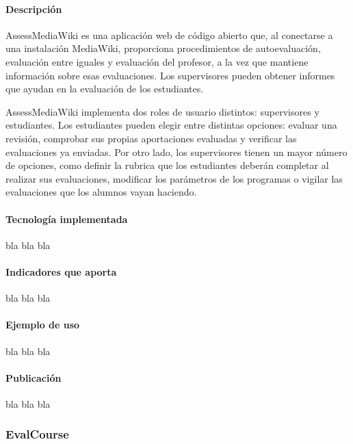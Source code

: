 \paragraph*{Descripción}

AssessMediaWiki es una aplicación web de código abierto que, al conectarse a una instalación MediaWiki, proporciona procedimientos de autoevaluación, evaluación entre iguales y evaluación del profesor, a la vez que mantiene información sobre esas evaluaciones. Los supervisores pueden obtener informes que ayudan en la evaluación de los estudiantes.

AssessMediaWiki implementa dos roles de usuario distintos: supervisores y estudiantes. Los estudiantes pueden elegir entre distintas opciones: evaluar una revisión, comprobar sus propias aportaciones evaluadas y verificar las evaluaciones ya enviadas. Por otro lado, los supervisores tienen un mayor número de opciones, como definir la rubrica que los estudiantes deberán completar al realizar sus evaluaciones, modificar los parámetros de los programas o vigilar las evaluaciones que los alumnos vayan haciendo.

\paragraph*{Tecnología implementada}

bla bla bla

\paragraph*{Indicadores que aporta}

bla bla bla

\paragraph*{Ejemplo de uso}

bla bla bla

\paragraph*{Publicación}

bla bla bla

\subsubsection{EvalCourse}

